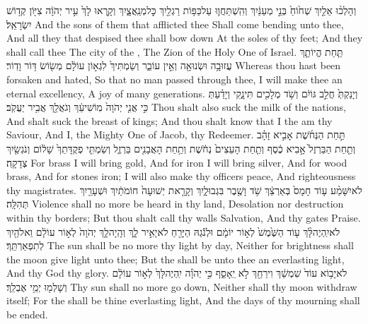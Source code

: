 {וְהָלְכ֨וּ אֵלַ֤יִךְ שְׁח֙וֹחַ֙ בְּנֵ֣י מְעַנַּ֔יִךְ וְהִֽשְׁתַּחֲו֛וּ עַל\maqqaf כַּפּ֥וֹת רַגְלַ֖יִךְ כׇּל\maqqaf מְנַֽאֲצָ֑יִךְ וְקָ֤רְאוּ לָךְ֙ עִ֣יר יְהֹוָ֔ה צִיּ֖וֹן קְד֥וֹשׁ יִשְׂרָאֵֽל׃}
{And the sons of them that afflicted thee Shall come bending unto thee, And all they that despised thee shall bow down At the soles of thy feet; And they shall call thee The city of the \lord, The Zion of the Holy One of Israel.}
{תַּ֧חַת הֱיוֹתֵ֛ךְ עֲזוּבָ֥ה וּשְׂנוּאָ֖ה וְאֵ֣ין עוֹבֵ֑ר וְשַׂמְתִּיךְ֙ לִגְא֣וֹן עוֹלָ֔ם מְשׂ֖וֹשׂ דּ֥וֹר וָדֽוֹר׃}
{Whereas thou hast been forsaken and hated, So that no man passed through thee, I will make thee an eternal excellency, A joy of many generations.}
{וְיָנַקְתְּ֙ חֲלֵ֣ב גּוֹיִ֔ם וְשֹׁ֥ד מְלָכִ֖ים תִּינָ֑קִי וְיָדַ֗עַתְּ כִּ֣י אֲנִ֤י יְהֹוָה֙ מֽוֹשִׁיעֵ֔ךְ וְגֹאֲלֵ֖ךְ אֲבִ֥יר יַעֲקֹֽב׃}
{Thou shalt also suck the milk of the nations, And shalt suck the breast of kings; And thou shalt know that I the \lord\space am thy Saviour, And I, the Mighty One of Jacob, thy Redeemer.}
{תַּ֣חַת הַנְּחֹ֜שֶׁת אָבִ֣יא זָהָ֗ב וְתַ֤חַת הַבַּרְזֶל֙ אָ֣בִיא כֶ֔סֶף וְתַ֤חַת הָעֵצִים֙ נְחֹ֔שֶׁת וְתַ֥חַת הָאֲבָנִ֖ים בַּרְזֶ֑ל וְשַׂמְתִּ֤י פְקֻדָּתֵךְ֙ שָׁל֔וֹם וְנֹגְשַׂ֖יִךְ צְדָקָֽה׃}
{For brass I will bring gold, And for iron I will bring silver, And for wood brass, And for stones iron; I will also make thy officers peace, And righteousness thy magistrates.}
{לֹא\maqqaf יִשָּׁמַ֨ע ע֤וֹד חָמָס֙ בְּאַרְצֵ֔ךְ שֹׁ֥ד וָשֶׁ֖בֶר בִּגְבוּלָ֑יִךְ וְקָרָ֤את יְשׁוּעָה֙ חוֹמֹתַ֔יִךְ וּשְׁעָרַ֖יִךְ תְּהִלָּֽה׃}
{Violence shall no more be heard in thy land, Desolation nor destruction within thy borders; But thou shalt call thy walls Salvation, And thy gates Praise.}
{לֹא\maqqaf יִֽהְיֶה\maqqaf לָּ֨ךְ ע֤וֹד הַשֶּׁ֙מֶשׁ֙ לְא֣וֹר יוֹמָ֔ם וּלְנֹ֕גַהּ הַיָּרֵ֖חַ לֹא\maqqaf יָאִ֣יר לָ֑ךְ וְהָֽיָה\maqqaf לָ֤ךְ יְהֹוָה֙ לְא֣וֹר עוֹלָ֔ם וֵאלֹהַ֖יִךְ לְתִפְאַרְתֵּֽךְ׃}
{The sun shall be no more thy light by day, Neither for brightness shall the moon give light unto thee; But the \lord\space shall be unto thee an everlasting light, And thy God thy glory.}
{לֹא\maqqaf יָב֥וֹא עוֹד֙ שִׁמְשֵׁ֔ךְ וִירֵחֵ֖ךְ לֹ֣א יֵֽאָסֵ֑ף כִּ֣י יְהֹוָ֗ה יִֽהְיֶה\maqqaf לָּךְ֙ לְא֣וֹר עוֹלָ֔ם וְשָׁלְמ֖וּ יְמֵ֥י אֶבְלֵֽךְ׃}
{Thy sun shall no more go down, Neither shall thy moon withdraw itself; For the \lord\space shall be thine everlasting light, And the days of thy mourning shall be ended.}
